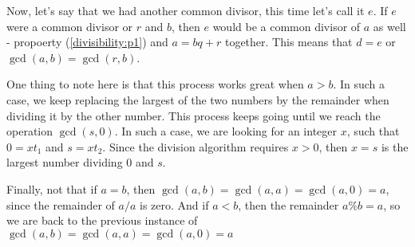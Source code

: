 Now, let's say that we had another common divisor, this time let's call it $e$.
If $e$ were a common divisor or $r$ and $b$, then $e$ would be a common divisor of $a$ as well
- propoerty (\ref{divisibility:p1}) and $a = bq + r$ together.
This means that $d = e$ or $\gcd(a,b) = \gcd(r,b)$.

One thing to note here is that this process works great when $a > b$.
In such a case, we keep replacing the largest of the two numbers by the remainder when dividing it by the other number.
This process keeps going until we reach the operation $\gcd(s,0)$.
In such a case, we are looking for an integer $x$, such that $0 = xt_1$ and $s = xt_2$.
Since the division algorithm requires $x>0$, then $x=s$ is the largest number dividing $0$ and $s$.

Finally, not that if $a=b$, then $\gcd(a,b) = \gcd(a,a) = \gcd(a,0) = a$, since the remainder of $a/a$ is zero.
And if $a < b$, then the remainder $a\%b = a$, so we are back to the previous instance of $\gcd(a,b) = \gcd(a,a) = \gcd(a,0) = a$